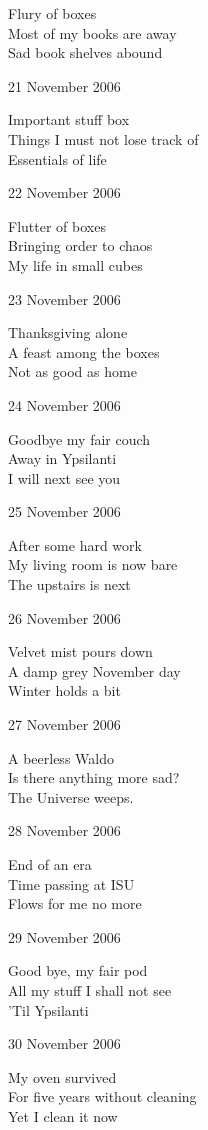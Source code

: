 \documentclass[12pt]{article}
\begin{document}
Flury of boxes \\
Most of my books are away \\
Sad book shelves abound

21 November 2006 

Important stuff box \\
Things I must not lose track of \\
Essentials of life

22 November 2006

Flutter of boxes \\
Bringing order to chaos \\
My life in small cubes

23 November 2006

Thanksgiving alone \\
A feast among the boxes \\
Not as good as home

24 November 2006

Goodbye my fair couch \\
Away in Ypsilanti \\
I will next see you


\newpage

25 November 2006

After some hard work \\
My living room is now bare \\
The upstairs is next

26 November 2006

Velvet mist pours down \\
A damp grey November day \\
Winter holds a bit

27 November 2006

A beerless Waldo \\
Is there anything more sad? \\
The Universe weeps.

28 November 2006

End of an era \\
Time passing at ISU \\
Flows for me no more

29 November 2006

Good bye, my fair pod \\
All my stuff I shall not see \\
'Til Ypsilanti

30 November 2006

My oven survived \\
For five years without cleaning \\
Yet I clean it now \\
\end{document}

